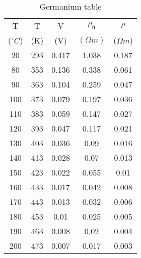 \begin{table}[]
\caption{Germanium table}
\label{tabge}
\begin{tabular}{|c|c|c|c|c|}
\hline
T             & T   & V     & $\rho_0$   & $\rho$     \\ 
($^{\circ}C$) & (K) & (V)   & $(\Omega m)$ & ($\Omega m$) \\ \hline
20            & 293 & 0.417 & 1.038      & 0.187      \\ \hline
80            & 353 & 0.136 & 0.338      & 0.061      \\ \hline
90            & 363 & 0.104 & 0.259      & 0.047      \\ \hline
100           & 373 & 0.079 & 0.197      & 0.036      \\ \hline
110           & 383 & 0.059 & 0.147      & 0.027      \\ \hline
120           & 393 & 0.047 & 0.117      & 0.021      \\ \hline
130           & 403 & 0.036 & 0.09       & 0.016      \\ \hline
140           & 413 & 0.028 & 0.07       & 0.013      \\ \hline
150           & 423 & 0.022 & 0.055      & 0.01       \\ \hline
160           & 433 & 0.017 & 0.042      & 0.008      \\ \hline
170           & 443 & 0.013 & 0.032      & 0.006      \\ \hline
180           & 453 & 0.01  & 0.025      & 0.005      \\ \hline
190           & 463 & 0.008 & 0.02       & 0.004      \\ \hline
200           & 473 & 0.007 & 0.017      & 0.003      \\ \hline
\end{tabular}
\end{table}